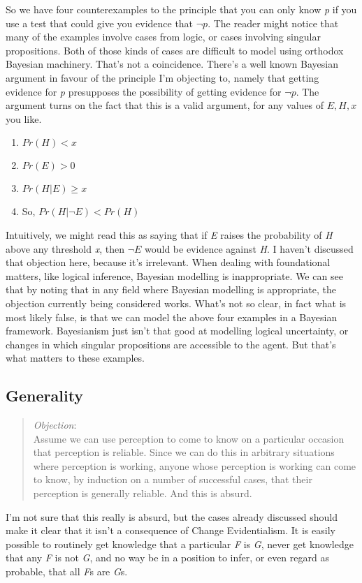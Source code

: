 So we have four counterexamples to the principle that you can only know \emph{p} if you use a test that could give you evidence that $\neg p$. The reader might notice that many of the examples involve cases from logic, or cases involving singular propositions. Both of those kinds of cases are difficult to model using orthodox Bayesian machinery. That's not a coincidence. There's a well known Bayesian argument in favour of the principle I'm objecting to, namely that getting evidence for \emph{p} presupposes the possibility of getting evidence for $\neg p$. The argument turns on the fact that this is a valid argument, for any values of $E, H, x$ you like.

\begin{enumerate}
\item{} $Pr(H) < x$

\item{} $Pr(E) > 0$

\item{} $Pr(H | E) \geq x$

\item{} So, $Pr(H | \neg E) < Pr(H)$

\end{enumerate}
Intuitively, we might read this as saying that if \emph{E} raises the probability of \emph{H} above any threshold \emph{x}, then $\neg E$ would be evidence against \emph{H}. I haven't discussed that objection here, because it's irrelevant. When dealing with foundational matters, like logical inference, Bayesian modelling is inappropriate. We can see that by noting that in any field where Bayesian modelling is appropriate, the objection currently being considered works. What's not so clear, in fact what is most likely false, is that we can model the above four examples in a Bayesian framework. Bayesianism just isn't that good at modelling logical uncertainty, or changes in which singular propositions are accessible to the agent. But that's what matters to these examples.

\subsection{Generality}
\label{generality}

\begin{quote}
\emph{Objection}:\\
Assume we can use perception to come to know on a particular occasion that perception is reliable. Since we can do this in arbitrary situations where perception is working, anyone whose perception is working can come to know, by induction on a number of successful cases, that their perception is generally reliable. And this is absurd.
\end{quote}
I'm not sure that this really is absurd, but the cases already discussed should make it clear that it isn't a consequence of Change Evidentialism. It is easily possible to routinely get knowledge that a particular \emph{F} is \emph{G}, never get knowledge that any \emph{F} is not \emph{G}, and no way be in a position to infer, or even regard as probable, that all \emph{F}s are \emph{G}s.

